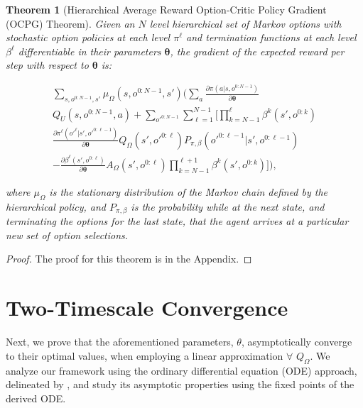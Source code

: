\documentclass[letterpaper]{article} %
\newtheorem{theorem}{Theorem}
\newcommand{\citet}[1]{\citeauthor{#1} \shortcite{#1}}
\begin{document}
\begin{theorem}[Hierarchical Average Reward Option-Critic Policy Gradient (OCPG) Theorem]
\label{HARPG}
Given an $N$ level hierarchical set of  Markov  options  with  stochastic  option  policies at each level $\pi^\ell$ and termination functions at each level $\beta^\ell$ differentiable in their parameters $\bm{\theta}$, the gradient of the expected reward per step with respect to $\bm{\theta}$ is:

\begin{footnotesize}
\begin{align*}
    \sum_{s,o^{0:N-1},s'}\!\!\!\!\mu_\Omega(s,o^{0:N-1},s')
    \bigg(\sum_{a} \frac{\partial \pi(a|s,o^{0:N-1})}{\partial \bm{\theta}} \\
    Q_U(s,o^{0:N-1},a) +  \sum_{o'^{0:N-1}} \sum_{\ell=1}^{N-1} \bigg[ \!\prod_{k=N-1}^{\ell}\!\!\!\!\beta^k(s',o^{0:k}) \\ \frac{\partial \pi^\ell(o'^\ell|s',o'^{0:\ell-1})}{\partial \bm{\theta}} Q_\Omega(s',o'^{0:\ell}) P_{\pi,\beta}(o'^{0:\ell-1}|s',o^{0:\ell-1}) \\
    - \frac{\partial \beta^\ell(s',o^{0:\ell})}{\partial \bm{\theta}} A_\Omega(s',o^{0:\ell})\!\!\!\!\prod_{k=N-1}^{\ell+1}\!\!\!\!\beta^k(s',o^{0:k}) \bigg] \bigg),
\end{align*}
\end{footnotesize}
where $\mu_\Omega$ is the stationary distribution of the Markov chain defined by the hierarchical policy, and $P_{\pi,\beta}$ is the probability while at the next state, and terminating the options for the last state, that the agent arrives at a particular new set of option selections.
\end{theorem}

\begin{proof}
The proof for this theorem is in the Appendix.
\end{proof}

\section{Two-Timescale Convergence}
Next, we prove that the aforementioned parameters, $\theta$, asymptotically converge to their optimal values, when employing a linear approximation $\forall$ $Q_\Omega$.
We analyze our framework using the ordinary differential equation (ODE) approach, delineated by \citet{bhatnagar2009natural}, and study its asymptotic properties using the fixed points of the derived ODE.

\end{document}
